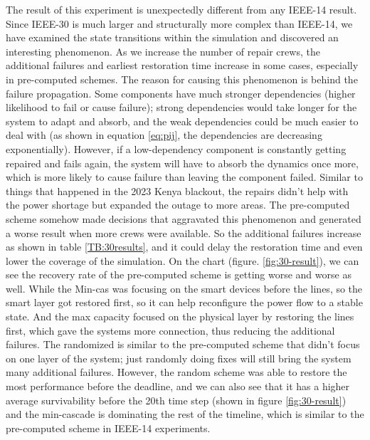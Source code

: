 \documentclass[conference]{IEEEtran}
\begin{document}
The result of this experiment is unexpectedly different from any IEEE-14 result. Since IEEE-30 is much larger and structurally more complex than IEEE-14, we have examined the state transitions within the simulation and discovered an interesting phenomenon. As we increase the number of repair crews, the additional failures and earliest restoration time increase in some cases,  especially in pre-computed schemes. The reason for causing this phenomenon is behind the failure propagation. Some components have much stronger dependencies (higher likelihood to fail or cause failure); strong dependencies would take longer for the system to adapt and absorb, and the weak dependencies could be much easier to deal with (as shown in equation \ref{eq:pij}, the dependencies are decreasing exponentially). However, if a low-dependency component is constantly getting repaired and fails again, the system will have to absorb the dynamics once more, which is more likely to cause failure than leaving the component failed. Similar to things that happened in the 2023 Kenya blackout, the repairs didn't help with the power shortage but expanded the outage to more areas. 
The pre-computed scheme somehow made decisions that aggravated this phenomenon and generated a worse result when more crews were available. So the additional failures increase as shown in table \ref{TB:30results}, and it could delay the restoration time and even lower the coverage of the simulation. On the chart (figure. \ref{fig:30-result}), we can see the recovery rate of the pre-computed scheme is getting worse and worse as well. While the Min-cas was focusing on the smart devices before the lines, so the smart layer got restored first, so it can help reconfigure the power flow to a stable state. And the max capacity focused on the physical layer by restoring the lines first, which gave the systems more connection, thus reducing the additional failures. The randomized is similar to the pre-computed scheme that didn't focus on one layer of the system; just randomly doing fixes will still bring the system many additional failures. However, the random scheme was able to restore the most performance before the deadline, and we can also see that it has a higher average survivability before the 20th time step (shown in figure \ref{fig:30-result}) and the min-cascade is dominating the rest of the timeline, which is similar to the pre-computed scheme in IEEE-14 experiments. 
\end{document}
